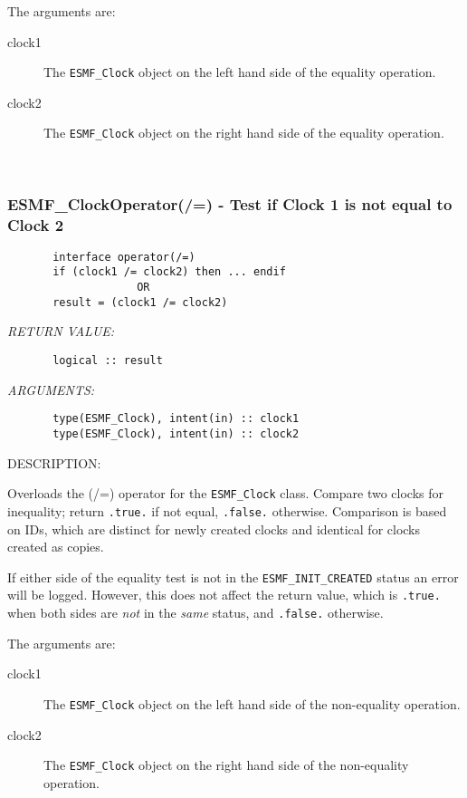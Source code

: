        The arguments are:
       \begin{description}
       \item[clock1]
            The {\tt ESMF\_Clock} object on the left hand side of the equality
            operation.
       \item[clock2]
            The {\tt ESMF\_Clock} object on the right hand side of the equality
            operation.
       \end{description}
   
 
\mbox{}\hrulefill\ 
 
\subsubsection [ESMF\_ClockOperator(/=)] {ESMF\_ClockOperator(/=) - Test if Clock 1 is not equal to Clock 2}


  
\begin{verbatim}       interface operator(/=)
       if (clock1 /= clock2) then ... endif
                    OR
       result = (clock1 /= clock2)\end{verbatim}{\em RETURN VALUE:}
\begin{verbatim}       logical :: result\end{verbatim}{\em ARGUMENTS:}
\begin{verbatim}       type(ESMF_Clock), intent(in) :: clock1
       type(ESMF_Clock), intent(in) :: clock2\end{verbatim}
{\sf DESCRIPTION:\\ }


       Overloads the (/=) operator for the {\tt ESMF\_Clock} class.
       Compare two clocks for inequality; return {\tt .true.} if not equal,
       {\tt .false.} otherwise. Comparison is based on IDs, which are distinct
       for newly created clocks and identical for clocks created as copies.
  
       If either side of the equality test is not in the
       {\tt ESMF\_INIT\_CREATED} status an error will be logged. However, this
       does not affect the return value, which is {\tt .true.} when both sides
       are {\em not} in the {\em same} status, and {\tt .false.} otherwise.
  
       The arguments are:
       \begin{description}
       \item[clock1]
            The {\tt ESMF\_Clock} object on the left hand side of the
            non-equality operation.
       \item[clock2]
            The {\tt ESMF\_Clock} object on the right hand side of the
            non-equality operation.
       \end{description}
   
